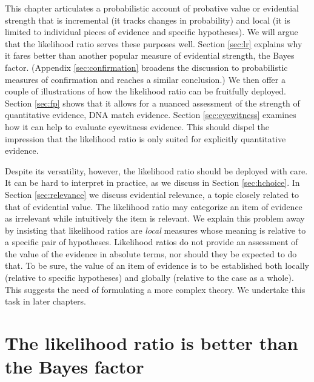 \documentclass[
  10pt,
  dvipsnames,enabledeprecatedfontcommands]{scrartcl}
\begin{document}
This chapter articulates a probabilistic account of probative value or
evidential strength that is incremental (it tracks changes in
probability) and local (it is limited to individual pieces of evidence
and specific hypotheses). We will argue that the likelihood ratio serves
these purposes well. Section \ref{sec:lr} explains why it fares better
than another popular measure of evidential strength, the Bayes factor.
(Appendix \ref{sec:confirmation} broadens the discussion to
probabilistic measures of confirmation and reaches a similar
conclusion.) We then offer a couple of illustrations of how the
likelihood ratio can be fruitfully deployed. Section \ref{sec:fp} shows
that it allows for a nuanced assessment of the strength of quantitative
evidence, DNA match evidence. Section \ref{sec:eyewitness} examines how
it can help to evaluate eyewitness evidence. This should dispel the
impression that the likelihood ratio is only suited for explicitly
quantitative evidence.

Despite its versatility, however, the likelihood ratio should be
deployed with care. It can be hard to interpret in practice, as we
discuss in Section \ref{sec:hchoice}. In Section \ref{sec:relevance} we
discuss evidential relevance, a topic closely related to that of
evidential value. The likelihood ratio may categorize an item of
evidence as irrelevant while intuitively the item is relevant. We
explain this problem away by insisting that likelihood ratios are
\textit{local} measures whose meaning is relative to a specific pair of
hypotheses. Likelihood ratios do not provide an assessment of the value
of the evidence in absolute terms, nor should they be expected to do
that. To be sure, the value of an item of evidence is to be established
both locally (relative to specific hypotheses) and globally (relative to
the case as a whole). This suggests the need of formulating a more
complex theory. We undertake this task in later chapters.

\hypertarget{the-likelihood-ratio-is-better-than-the-bayes-factor}{%
\section{The likelihood ratio is better than the Bayes
factor}\label{the-likelihood-ratio-is-better-than-the-bayes-factor}}

\label{sec:lr}
\end{document}
